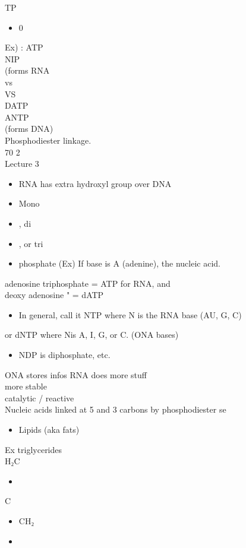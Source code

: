 \documentclass{article}
\begin{document}
TP\begin{itemize}\item 0
\end{itemize}
Ex) : ATP\\
NIP\\
(forms RNA\\
vs\\
VS\\
DATP\\
ANTP\\
(forms DNA)\\
Phosphodiester linkage.\\
70 2\\
Lecture 3\\
\begin{itemize}\item RNA has extra hydroxyl group over DNA
\item  Mono\item , di\item , or tri\item phosphate
(Ex) If base is A (adenine), the nucleic acid.
\end{itemize}
adenosine triphosphate = ATP for RNA, and\\
deoxy adenosine " = dATP\\
\begin{itemize}\item  In general, call it NTP where N is the RNA base (AU, G, C)
\end{itemize}
or dNTP where Nis A, I, G, or C. (ONA bases)\\
\begin{itemize}\item  NDP is diphosphate, etc.
\end{itemize}
ONA stores infos RNA does more stuff\\
more stable\\
catalytic / reactive\\
Nucleic acids linked at 5 and 3 carbons by phosphodiester se\\
\begin{itemize}\item  Lipids (aka fats)
\end{itemize}
Ex triglycerides\\
H₂C \begin{itemize}\item 
\end{itemize}
C \begin{itemize}\item  CH₂
\item 
\end{itemize}
\end{document}

